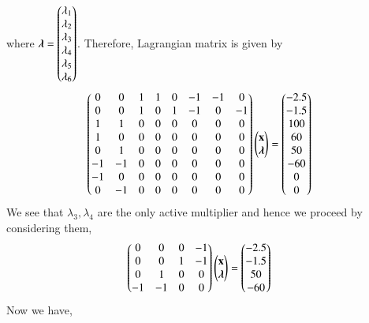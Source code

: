 \documentclass[journal,12pt,twocolumn]{IEEEtran}
\begin{document}
where $\boldsymbol{\lambda}=\begin{pmatrix}\lambda_1 \\ \lambda_2 \\ \lambda_3 \\ \lambda_4 \\ \lambda_5 \\ \lambda_6\end{pmatrix} $. Therefore, Lagrangian matrix is given by
\begin{align}
    \begin{pmatrix}0 & 0 & 1 & 1 & 0 & -1 & -1 & 0 \\ 0 & 0 & 1 & 0 & 1 & -1 & 0 & -1 \\ 1 & 1 & 0 & 0 & 0 & 0 & 0 & 0 \\ 1 & 0 & 0 & 0 & 0 & 0 & 0 & 0 \\ 0 & 1 & 0 & 0 & 0 & 0 & 0 & 0 \\ -1 & -1 & 0 & 0 & 0 & 0 & 0 & 0 \\ -1 & 0 & 0 & 0 & 0 & 0 & 0 & 0 \\ 0 & -1 & 0 & 0 & 0 & 0 & 0 & 0 \end{pmatrix}\begin{pmatrix}\mathbf{x} \\ \boldsymbol{\lambda}\end{pmatrix} &= \begin{pmatrix}-2.5 \\ -1.5 \\ 100 \\ 60 \\ 50 \\ -60 \\0 \\ 0 \end{pmatrix}
\end{align}
We see that $\lambda_3,\lambda_4$ are the only active multiplier and hence we proceed by considering them,
\begin{align}
    \begin{pmatrix}0 & 0 & 0 & -1 \\ 0 & 0 & 1 & -1 \\ 0 & 1 & 0 & 0 \\ -1 & -1 & 0 & 0\end{pmatrix}\begin{pmatrix}\mathbf{x}\\ \boldsymbol{\lambda}\end{pmatrix} &= \begin{pmatrix}-2.5 \\ -1.5 \\ 50 \\ -60\end{pmatrix}
\end{align}
Now we have,
\end{document}
